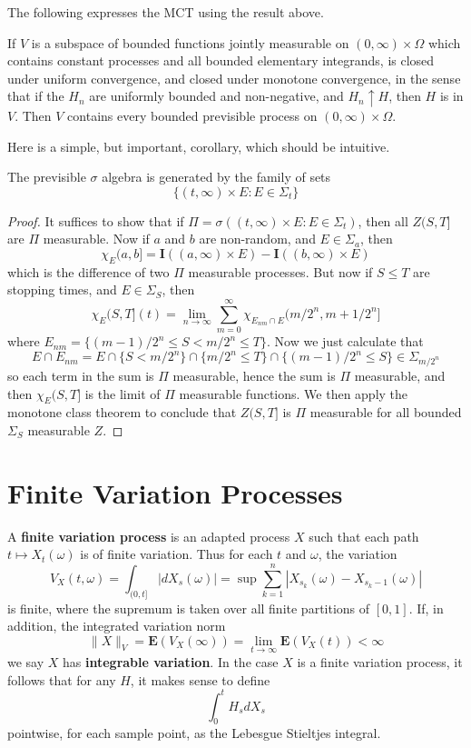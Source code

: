 The following expresses the MCT using the result above.

\begin{corollary}
    If $V$ is a subspace of bounded functions jointly measurable on $(0,\infty) \times \Omega$ which contains constant processes and all bounded elementary integrands, is closed under uniform convergence, and closed under monotone convergence, in the sense that if the $H_n$ are uniformly bounded and non-negative, and $H_n \uparrow H$, then $H$ is in $V$. Then $V$ contains every bounded previsible process on $(0,\infty) \times \Omega$.
\end{corollary}

Here is a simple, but important, corollary, which should be intuitive.

\begin{theorem}
    The previsible $\sigma$ algebra is generated by the family of sets
    \[ \{ (t, \infty) \times E : E \in \Sigma_t \} \]
\end{theorem}
\begin{proof}
    It suffices to show that if $\Pi = \sigma((t, \infty) \times E: E \in \Sigma_t)$, then all $Z(S,T]$ are $\Pi$ measurable. Now if $a$ and $b$ are non-random, and $E \in \Sigma_a$, then
    \[ \chi_E (a,b] = \mathbf{I}((a,\infty) \times E) - \mathbf{I}((b,\infty) \times E) \]
    which is the difference of two $\Pi$ measurable processes. But now if $S \leq T$ are stopping times, and $E \in \Sigma_S$, then
    \[ \chi_E(S,T](t) = \lim_{n \to \infty} \sum_{m = 0}^\infty \chi_{E_{nm} \cap E} (m/2^n, m+1/2^n] \]
    where $E_{nm} = \{ (m-1)/2^n \leq S < m/2^n \leq T \}$. Now we just calculate that
    \[ E \cap E_{nm} = E \cap \{ S < m/2^n \} \cap \{ m/2^n \leq T \} \cap \{ (m-1)/2^n \leq S \} \in \Sigma_{m/2^n} \]
    so each term in the sum is $\Pi$ measurable, hence the sum is $\Pi$ measurable, and then $\chi_E(S,T]$ is the limit of $\Pi$ measurable functions. We then apply the monotone class theorem to conclude that $Z(S,T]$ is $\Pi$ measurable for all bounded $\Sigma_S$ measurable $Z$.
\end{proof}

\section{Finite Variation Processes}

A {\bf finite variation process} is an adapted process $X$ such that each path $t \mapsto X_t(\omega)$ is of finite variation. Thus for each $t$ and $\omega$, the variation
%
\[ V_X(t,\omega) = \int_{(0,t]} |dX_s(\omega)| = \sup \sum_{k = 1}^n |X_{s_k}(\omega) - X_{s_k - 1}(\omega)| \]
%
is finite, where the supremum is taken over all finite partitions of $[0,1]$. If, in addition, the integrated variation norm
%
\[ \| X \|_V = \mathbf{E}(V_X(\infty)) = \lim_{t \to \infty} \mathbf{E}(V_X(t)) < \infty \]
%
we say $X$ has {\bf integrable variation}. In the case $X$ is a finite variation process, it follows that for any $H$, it makes sense to define
%
\[ \int_0^t H_s dX_s \]
%
pointwise, for each sample point, as the Lebesgue Stieltjes integral.

